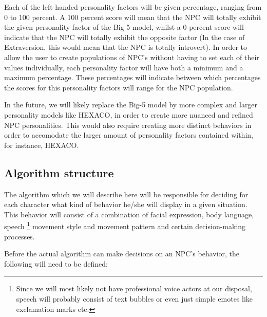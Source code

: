 \documentclass{article}
\begin{document}
    Each of the left-handed personality factors will be given percentage, ranging from 0 to 100 percent. A 100 percent score will mean that the NPC will totally exhibit the given personality 	   factor of the Big 5 model, whilst a 0 percent score will indicate that the NPC will totally exhibit the opposite factor (In the case of Extraversion, this would mean that the NPC is totally                   introvert). In order to allow the user to create populations of NPC's without having to set each of their values individually, each personality factor will have both a minimum and a maximum  percentage. These percentages will indicate between which percentages the scores for this personality factors will range for the NPC population. 

  In the future, we will likely replace the Big-5 model by more complex and larger personality models like HEXACO, in order to create more nuanced and refined NPC personalities. This would also require creating more distinct behaviors in order to accomodate the larger amount of personality factors contained within, for instance, HEXACO.

   \newpage
   \subsection{Algorithm structure}
    The algorithm which we will describe here will be responsible for deciding for each character what kind of behavior he/she will display in a given situation. This behavior will consist of a combination of facial expression, body language, speech \footnote{Since we will most likely not have professional voice actors at our disposal, speech will probably consist of text bubbles or even just simple emotes like exclamation marks etc.} movement style and movement pattern and certain decision-making processes. 

    Before the actual algorithm can make decisions on an NPC's behavior, the following will need to be defined:
\end{document}
